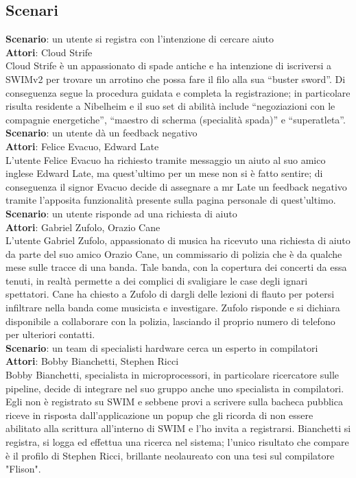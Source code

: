 \documentclass[a4paper,12pt]{article}
\begin{document}
\subsection{Scenari}
\textbf{Scenario}: un utente si registra con l'intenzione di cercare aiuto \\
\textbf{Attori}: Cloud Strife \\
Cloud Strife è un appassionato di spade antiche e ha intenzione di iscriversi a SWIMv2 per trovare un arrotino che possa fare il filo alla sua “buster sword”. Di conseguenza segue la procedura guidata  e completa la registrazione; in particolare risulta residente a Nibelheim e il suo set di abilità include “negoziazioni con le compagnie energetiche”, “maestro di scherma (specialità spada)” e “superatleta”. \\[1.5em]
\textbf{Scenario}: un utente dà un feedback negativo \\
\textbf{Attori}: Felice Evacuo, Edward Late \\
L'utente Felice Evacuo ha richiesto tramite messaggio un aiuto al suo amico inglese Edward Late, ma quest'ultimo per un mese non si è fatto sentire; di conseguenza il signor Evacuo decide di assegnare a mr Late un feedback negativo tramite l'apposita funzionalità presente sulla pagina personale di quest'ultimo. \\[1.5em]
\textbf{Scenario}: un utente risponde ad una richiesta di aiuto \\
\textbf{Attori}: Gabriel Zufolo, Orazio Cane \\
L'utente Gabriel Zufolo, appassionato di musica ha ricevuto una richiesta di aiuto da parte del suo amico Orazio Cane, un commissario di polizia che è da qualche mese sulle tracce di una banda. Tale banda, con la copertura dei concerti da essa tenuti, in realtà permette a dei complici di svaligiare le case degli ignari spettatori. Cane ha chiesto a Zufolo di dargli delle lezioni di flauto per potersi infiltrare nella banda come musicista e investigare. Zufolo risponde e si dichiara disponibile a collaborare con la polizia, lasciando il proprio numero di telefono per ulteriori contatti. \\[1.5em]
\textbf{Scenario}: un team di specialisti hardware cerca un esperto in compilatori \\
\textbf{Attori}: Bobby Bianchetti, Stephen Ricci \\
Bobby Bianchetti, specialista in microprocessori, in particolare ricercatore sulle pipeline, decide di integrare nel suo gruppo anche uno specialista in compilatori. Egli non è registrato su SWIM e sebbene provi a scrivere sulla bacheca pubblica riceve in risposta dall'applicazione un popup che gli ricorda di non essere abilitato alla scrittura all'interno di SWIM e l'ho invita a registrarsi. Bianchetti si registra, si logga ed effettua una ricerca nel sistema; l'unico risultato che compare è il profilo di Stephen Ricci, brillante neolaureato con una tesi sul compilatore "Flison".   \\[1.5em]
\end{document}
